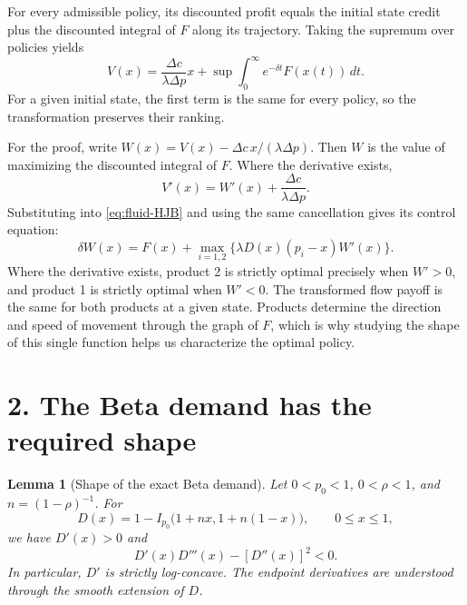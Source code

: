 \documentclass[11pt]{article}
\newtheorem{lemma}{Lemma}
\begin{document}
For every admissible policy, its discounted profit equals the initial
state credit plus the discounted integral of $F$ along its trajectory.
Taking the supremum over policies yields
\begin{equation}\label{eq:transform}
V(x)=\frac{\Delta c}{\lambda\Delta p}x+
       \sup\int_0^\infty e^{-\delta t}F(x(t))\,dt.
\end{equation}
For a given initial state, the first term is the same for every policy,
so the transformation preserves their ranking.

For the proof, write
$W(x)=V(x)-\Delta c\,x/(\lambda\Delta p)$.
Then $W$ is the value of maximizing the discounted integral of $F$.
Where the derivative exists,
\begin{equation*}
V'(x)=W'(x)+\frac{\Delta c}{\lambda\Delta p}.
\end{equation*}
Substituting into \eqref{eq:fluid-HJB} and using the same cancellation
gives its control equation:
\begin{equation}\label{eq:W-HJB}
\delta W(x)=F(x)+\max_{i=1,2}
             \{\lambda D(x)(p_i-x)W'(x)\}.
\end{equation}
Where the derivative exists, product 2 is strictly optimal precisely
when $W'>0$, and product 1 is strictly optimal when $W'<0$.
The transformed flow payoff is the same for both products at a given
state. Products determine the direction and speed of movement through
the graph of $F$, which is why studying the shape of this single function
helps us characterize the optimal policy.

\section*{2. The Beta demand has the required shape}
\begin{lemma}[Shape of the exact Beta demand]\label{lem:beta-marginal-demand}
Let $0<p_0<1$, $0<\rho<1$, and $n=(1-\rho)^{-1}$. For
\begin{equation*}
D(x)=1-I_{p_0}\bigl(1+nx,1+n(1-x)\bigr),\qquad 0\le x\le1,
\end{equation*}
we have $D'(x)>0$ and
\begin{equation*}
D'(x)D'''(x)-[D''(x)]^2<0.
\end{equation*}
In particular, $D'$ is strictly log-concave. The endpoint derivatives are
understood through the smooth extension of $D$.
\end{lemma}
\end{document}

